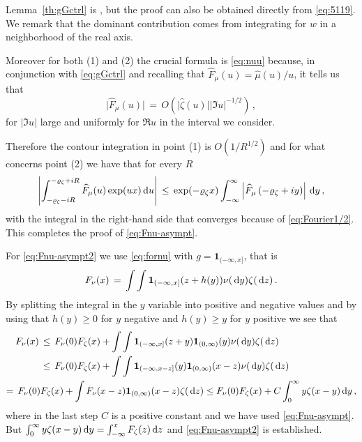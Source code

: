 \documentclass[reqno,11pt]{amsart}
\numberwithin{equation}{section}
\newcommand{\ind}{\mathbf{1}}
\newcommand{\dd}{\,\text{\rm d}}             %
\newcommand{\gz}{\zeta}
\begin{document}
\medskip

Lemma~\ref{th:gGctrl} is \cite[Lemma~4.4]{cf:GGG}, but the proof can also be obtained directly from \eqref{eq:5119}. We remark that the dominant contribution comes from integrating for $w$ in a neighborhood of the real axis.

\smallskip

Moreover for both (1) and (2) the crucial formula is \eqref{eq:nuu} because, in conjunction with \eqref{eq:gGctrl} and 
recalling that $\widehat F_\mu(u)= \widehat \mu (u) /u$,  it tells us 
that 
\begin{equation}
\vert \widehat F_\mu(u) \vert \,=\, O\left( \big\vert \widehat \gz(u)\big\vert \left \vert \Im u \right \vert^{-1/2}
\right)\, ,
\end{equation}
for $\vert \Im u \vert$ large and uniformly for $\Re u$ in the interval we consider. 

Therefore the contour integration in point (1) is $O(1/R^{1/2})$ and for what concerns point (2) we have that for every $R$
\begin{equation}
\left \vert 
 \int_{-\varrho_\gz -iR}^{-\varrho_\gz +iR} \widehat F_\mu(u) \exp(ux) \dd u\right\vert \, \le \, 
\exp(- \varrho_\gz x) \int_{-\infty}^\infty \left \vert \widehat F_\mu\left(-\varrho_\gz +i y \right) \right\vert \dd y\, , 
\end{equation} 
with the integral in the right-hand side that converges because of \eqref{eq:Fourier1/2}. This completes the proof of \eqref{eq:Fnu-asympt}.
 
 \smallskip
 
 For \eqref{eq:Fnu-asympt2} we use \eqref{eq:fornu} 
 with $g=\ind_{(-\infty, x]}$, that is
 \begin{equation}
 \label{eq:Fnu-c}
 F_\nu(x)\,=\, \int \int \ind_{(-\infty, x]} (z+h(y)) \nu(\dd y) \gz (\dd z)\, .
 \end{equation}
 By splitting the integral in the $y$ variable into positive and negative values and by using that $h(y) \ge 0$ for $y$ negative and $h(y)\ge y$ for $y$ positive we see that
\begin{equation}
\begin{split}
 F_\nu(x)\,&\le \, F_\nu(0) F_\gz(x)+ \int \int \ind_{(-\infty, x]} (z+y) \ind_{(0, \infty)}(y) \nu(\dd y) \gz (\dd z)
 \\
 &\le \,  F_\nu(0) F_\gz(x)+  \int \int \ind_{(-\infty, x-z]} (y) \ind_{(0, \infty)}(x-z) \nu(\dd y) \gz (\dd z)
 \\
 = \,  F_\nu(0) &F_\gz(x)+   \int F_\nu (x-z) \ind_{(0, \infty)}(x-z)  \gz (\dd z) 
 \le F_\nu(0) F_\gz(x)+ C\int_0^\infty y \gz(x-y) \dd y
 \, ,
 \end{split}
 \end{equation} 
where in  the last step $C$ is a positive constant and we have used \eqref{eq:Fnu-asympt}.
But $\int_0^\infty y \gz(x-y) \dd y= \int_{-\infty}^x F_\gz (z) \dd z$ and \eqref{eq:Fnu-asympt2}  is established.
\end{document}
